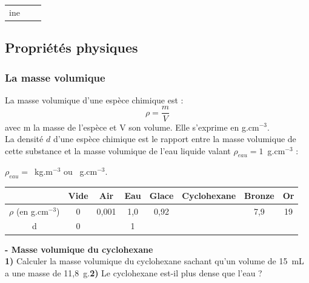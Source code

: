 \begin{tcolorbox}[colback=red!5!white,colframe=red!75!black,title=\textbf{Tests chimiques à connaître : }]
\begin{tabular}{|C{0.31}|C{0.3}|C{0.31}|}
ine
    \end{tabular}
\end{tcolorbox} 

\subsection{Propriétés physiques}
\subsubsection{La masse volumique}
\begin{tcolorbox}[colback=green!5!white,colframe=green!75!black,title=\textbf{Rappel : masse volumique et densité }]
La masse volumique d'une espèce chimique est :
\begin{equation*}
    \rho = \frac{m}{V}
\end{equation*}
avec m la masse de l'espèce et V son volume. Elle s'exprime en g.cm$^{-3}$.\\
La densité $d$ d'une espèce chimique est le rapport entre la masse volumique de cette substance et la masse volumique de l'eau liquide valant $\rho_{eau}=1$~g.cm$^{-3}$ :
\begin{equation*}
\end{equation*}
\end{tcolorbox}

\begin{tcolorbox}[colback=red!5!white,colframe=red!75!black,title=\textbf{Masse volumique de l'eau: }]
\begin{center}
    $\rho_{eau} = $~kg.m$^{-3}$ ou ~g.cm$^{-3}$. 
\end{center}
\end{tcolorbox}

\begin{tabular}{|c|C{0.06}|C{0.06}|C{0.06}|C{0.1}|C{0.15}|C{0.1}|C{0.1}|}
   \hline
     & Vide & Air & Eau & Glace & Cyclohexane & Bronze & Or \\
    \hline
    $\rho$ (en g.cm$^{-3}$) & 0 & 0,001 & 1,0 & 0,92 & & 7,9 & 19  \\
    \hline
    d & 0 &  & 1 &  &  & & \\
    \hline
    \end{tabular}
\begin{mdframed}[style=autreexo]
\textbf{ - Masse volumique du cyclohexane}\\
\textbf{1)} Calculer la masse volumique du cyclohexane sachant qu'un volume de 15~mL a une masse de 11,8~g.\newline \textbf{2)} Le cyclohexane est-il plus dense que l'eau ? \end{mdframed}
\newpage

